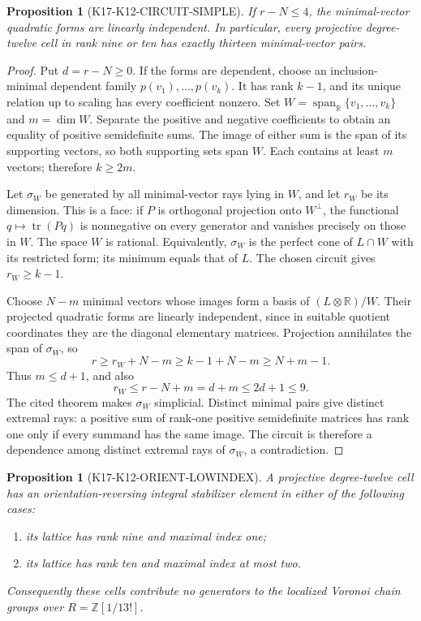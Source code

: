 \documentclass[11pt,a4paper]{article}
\newtheorem{proposition}[theorem]{Proposition}
\theoremstyle{definition}
\begin{document}
\begin{proposition}[K17-K12-CIRCUIT-SIMPLE]
\label{prop:k12-low-excess-simplicial}
If $r-N\leq4$, the minimal-vector quadratic forms are linearly
independent. In particular, every projective degree-twelve cell in
rank nine or ten has exactly thirteen minimal-vector pairs.
\end{proposition}

\begin{proof}
Put $d=r-N\geq0$. If the forms are dependent, choose an
inclusion-minimal dependent family $p(v_1),\ldots,p(v_k)$.
It has rank $k-1$, and its unique relation up to scaling has every
coefficient nonzero. Set $W=\operatorname{span}_{\mathbb R}
\{v_1,\ldots,v_k\}$ and $m=\dim W$. Separate the positive and negative
coefficients to obtain an equality of positive semidefinite sums.
The image of either sum is the span of its supporting vectors, so
both supporting sets span $W$. Each contains at least $m$ vectors;
therefore $k\geq2m$.

Let $\sigma_W$ be generated by all minimal-vector rays lying in $W$,
and let $r_W$ be its dimension. This is a face: if $P$ is orthogonal
projection onto $W^\perp$, the functional $q\mapsto\operatorname{tr}(Pq)$
is nonnegative on every generator and vanishes precisely on those
in $W$. The space $W$ is rational. Equivalently, $\sigma_W$ is the
perfect cone of $L\cap W$ with its restricted form; its minimum
equals that of $L$. The chosen circuit gives $r_W\geq k-1$.

Choose $N-m$ minimal vectors whose images form a basis of
$(L\otimes\mathbb R)/W$. Their projected quadratic forms are linearly
independent, since in suitable quotient coordinates they are the
diagonal elementary matrices. Projection annihilates the span of
$\sigma_W$, so
\[
 r\geq r_W+N-m\geq k-1+N-m\geq N+m-1.
\]
Thus $m\leq d+1$, and also
\[
 r_W\leq r-N+m=d+m\leq2d+1\leq9.
\]
The cited theorem makes $\sigma_W$ simplicial. Distinct minimal pairs
give distinct extremal rays: a positive sum of rank-one positive
semidefinite matrices has rank one only if every summand has the
same image. The circuit is therefore a dependence among distinct
extremal rays of $\sigma_W$, a contradiction.
\end{proof}

\begin{proposition}[K17-K12-ORIENT-LOWINDEX]
\label{prop:k12-low-index-orientation}
A projective degree-twelve cell has an orientation-reversing integral
stabilizer element in either of the following cases:
\begin{enumerate}
\item its lattice has rank nine and maximal index one;
\item its lattice has rank ten and maximal index at most two.
\end{enumerate}
Consequently these cells contribute no generators to the localized
Voronoi chain groups over $R=\mathbb Z[1/13!]$.
\end{proposition}
\end{document}
